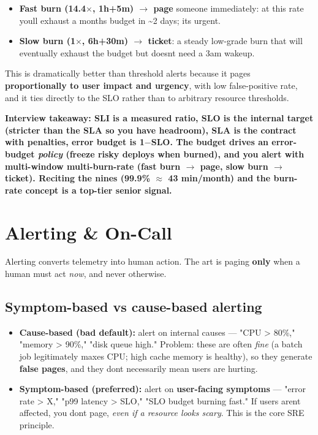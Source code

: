 \documentclass[11pt]{article}
\providecommand{\tightlist}{\setlength{\itemsep}{1pt}\setlength{\parskip}{0pt}}
\begin{document}
\begin{itemize}
\tightlist
\item
  \textbf{Fast burn (14.4\(\times\), 1h+5m) \(\rightarrow\) page} someone immediately: at this rate you\textquotesingle ll exhaust a month\textquotesingle s budget in \textasciitilde2 days; it\textquotesingle s urgent.
\item
  \textbf{Slow burn (1\(\times\), 6h+30m) \(\rightarrow\) ticket}: a steady low-grade burn that will eventually exhaust the budget but doesn\textquotesingle t need a 3am wakeup.
\end{itemize}

This is dramatically better than threshold alerts because it pages \textbf{proportionally to user impact and urgency}, with low false-positive rate, and it ties directly to the SLO rather than to arbitrary resource thresholds.

\textbf{Interview takeaway: SLI is a measured ratio, SLO is the internal target (stricter than the SLA so you have headroom), SLA is the contract with penalties, error budget is 1\(-\)SLO. The budget drives an error-budget \emph{policy} (freeze risky deploys when burned), and you alert with multi-window multi-burn-rate (fast burn \(\rightarrow\) page, slow burn \(\rightarrow\) ticket). Reciting the nines (99.9\% \(\approx\) 43 min/month) and the burn-rate concept is a top-tier senior signal.}

\section{Alerting \& On-Call}\label{alerting--on-call}

Alerting converts telemetry into human action. The art is paging \textbf{only} when a human must act \emph{now}, and never otherwise.

\subsection{Symptom-based vs cause-based alerting}\label{symptom-based-vs-cause-based-alerting}

\begin{itemize}
\tightlist
\item
  \textbf{Cause-based (bad default):} alert on internal causes --- "CPU \textgreater{} 80\%," "memory \textgreater{} 90\%," "disk queue high." Problem: these are often \emph{fine} (a batch job legitimately maxes CPU; high cache memory is healthy), so they generate \textbf{false pages}, and they don\textquotesingle t necessarily mean users are hurting.
\item
  \textbf{Symptom-based (preferred):} alert on \textbf{user-facing symptoms} --- "error rate \textgreater{} X," "p99 latency \textgreater{} SLO," "SLO budget burning fast." If users aren\textquotesingle t affected, you don\textquotesingle t page, \emph{even if a resource looks scary}. This is the core SRE principle.
\end{itemize}
\end{document}
